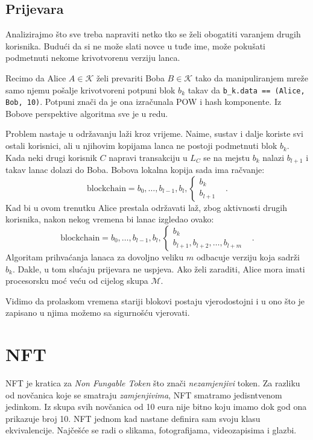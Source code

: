 \documentclass[12pt]{scrartcl} %
\newcommand{\tt}[1]{
\text{#1}
}
\newcommand{\korisnici}{\mathcal{K}}
\newcommand{\miners}{\mathcal{M}}
\begin{document}
\subsection{Prijevara}
Analizirajmo što sve treba napraviti netko tko se želi obogatiti varanjem drugih korisnika. Budući da si ne može slati novce u tuđe ime, može pokušati podmetnuti nekome krivotvorenu verziju lanca. 
\begin{primjer}
Recimo da Alice $A \in \korisnici$ želi prevariti Boba $B \in \korisnici$ tako da manipuliranjem mreže samo njemu pošalje krivotvoreni potpuni blok $b_k$ takav da \texttt{b\_k.data == (Alice, Bob, 10)}. Potpuni znači da je ona izračunala POW i hash komponente. Iz Bobove perspektive algoritma sve je u redu. 
\end{primjer}
Problem nastaje u održavanju laži kroz vrijeme. Naime, sustav i dalje koriste svi ostali korisnici, ali u njihovim kopijama lanca ne postoji podmetnuti blok $b_k$. Kada neki drugi korisnik $C$ napravi transakciju u $L_C$ se na mejstu $b_k$ nalazi $b_{l+1}$ i takav lanac dolazi do Boba. Bobova lokalna kopija sada ima račvanje:
\[
\tt{blockchain} = b_0,\hdots, b_{l-1}, b_{l}, \begin{cases}
    b_k & \\
    b_{l+1} &
\end{cases}
.\]
Kad bi u ovom trenutku Alice prestala održavati laž, zbog aktivnosti drugih korisnika, nakon nekog vremena bi lanac izgledao ovako:
\[
\tt{blockchain} = b_0,\hdots, b_{l-1}, b_{l}, \begin{cases}
    b_k & \\
    b_{l+1}, b_{l+2}, \hdots, b_{l+m} &
\end{cases}
.\]
Algoritam prihvaćanja lanaca za dovoljno veliku $m$ odbacuje verziju koja sadrži $b_k$. Dakle, u tom slućaju prijevara ne uspjeva. Ako želi zaraditi, Alice mora imati procesorsku moć veću od cijelog skupa $\miners$. 

Vidimo da prolaskom vremena stariji blokovi postaju vjerodostojni i u ono što je zapisano u njima možemo sa sigurnošću vjerovati.

\section{NFT}
NFT je kratica za \emph{Non Fungable Token} što znači \emph{nezamjenjivi} token. Za razliku od novčanica koje se smatraju \emph{zamjenjivima}, NFT smatramo jedisntvenom jedinkom. Iz skupa svih novčanica od 10 eura nije bitno koju imamo dok god ona prikazuje broj 10. NFT jednom kad nastane definira sam svoju klasu ekvivalencije. Najčešće se radi o slikama, fotografijama, videozapisima i glazbi. 
\end{document}
